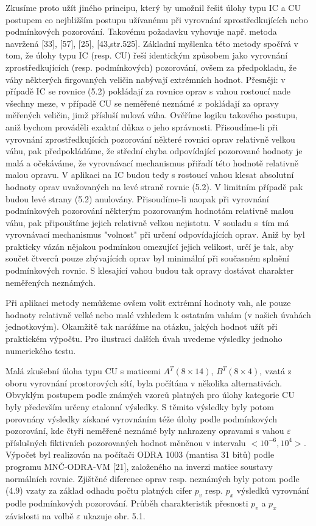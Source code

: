 Zkusíme proto užít jiného principu, který by umožnil řešit úlohy typu
IC a CU postupem co nejbližším postupu užívanému při vyrovnání
zprostředkujících nebo podmínkových pozorování.  Takovému požadavku
vyhovuje např. metoda navržená  [33], [57], [25],
[43,str.525]. Základní myšlenka této metody spočívá
%
%
v tom, 
že úlohy typu IC (resp. CU) řeší identickým způsobem
jako vyrovnání zprostředkujících (resp. podmínkových) pozorování,
ovšem za předpokladu, že váhy některých firgovaných veličin
nabývají extrémních hodnot. Přesněji:
%
\Xemph
{
   v případě IC se rovnice (5.2) pokládají za rovnice oprav s vahou
   rostoucí  nade všechny meze, v případě CU se neměřené neznámé $x$
   pokládají za opravy měřených veličin, jimž přísluší nulová váha.
}
%
Ověříme logiku takového
postupu, aniž bychom prováděli exaktní důkaz o jeho správnosti.
Přisoudíme-li při vyrovnání zprostředkujících pozorování
některé rovnici oprav relativně velkou váhu, pak předpokládáme, že
střední chyba odpovídající pozorované hodnoty je malá a
očekáváme, že vyrovnávací mechanismus přiřadí této hodnotě relativně
malou opravu. V aplikaci na IC budou tedy s rostoucí vahou
klesat absolutní hodnoty oprav uvažovaných na levé straně rovnic
(5.2). V limitním případě pak budou levé strany (5.2) anulovány.
Přisoudíme-li naopak při vyrovnání podmínkových pozorování
některým pozorovaným hodnotám relativně malou váhu, pak
připouštíme jejich relativně velkou nejistotu. V souladu s~tím má
vyrovnávací mechanismus "volnost" při určení odpovídajících oprav.
Aniž by byl prakticky vázán nějakou podmínkou omezující jejich
velikost, určí je tak, aby součet čtverců pouze zbývajících
oprav byl minimální při současném splnění podmínkových rovnic. S
klesající vahou budou tak opravy dostávat charakter neměřených
neznámých.

Při aplikaci  metody nemůžeme ovšem volit extrémní
hodnoty vah, ale pouze hodnoty relativně velké nebo malé
vzhledem k ostatním vahám (v našich úvahách jednotkovým). Okamžitě
tak narážíme na otázku, jakých hodnot užít při praktickém
výpočtu. Pro ilustraci dalších úvah uvedeme výsledky jednoho
numerického testu.

Malá zkušební úloha typu CU s maticemi
$A^T (8\times14)$, $B^T (8\times4)$,
vzatá z oboru vyrovnání prostorových sítí, byla počítána v
několika alternativách. Obvyklým postupem podle známých vzorců
platných pro úlohy kategorie CU byly především určeny etalonní
výsledky. S těmito výsledky byly potom porovnány výsledky získané
vyrovnáním téže úlohy podle podmínkových pozorování, kde čtyři
%
neměřené  neznámé byly nahrazeny opravami s vahou
$\varepsilon$ příslušných fiktivních pozorovaných hodnot měněnou v
intervalu $<\!10^{-6},  10^4\!>$. Výpočet byl realizován na počítači ODRA 1003
(mantisa 31 bitů) podle programu MNČ-ODRA-VM [21], založeného na
inverzi matice soustavy normálních rovnic. Zjištěné diference oprav
resp. neznámých byly potom podle (4.9) vzaty za základ odhadu počtu
platných cifer $p_v$ resp. $p_x$ výsledků vyrovnání podle podmínkových
pozorování. Průběh charakteristik přesnosti $p_v$ a $p_x$ závislosti
na volbě $\varepsilon$ ukazuje obr. 5.1.

